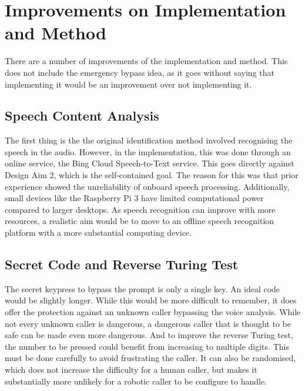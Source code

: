 \documentclass[main.tex]{subfiles}
\begin{document}
\section{Improvements on Implementation and Method}
There are a number of improvements of the implementation and method. This does not include the emergency bypass idea, as it goes without saying that implementing it would be an improvement over not implementing it.

\subsection{Speech Content Analysis}
The first thing is the the original identification method involved recognising the speech in the audio. However, in the implementation, this was done through an online service, the Bing Cloud Speech-to-Text service. This goes directly against Design Aim 2, which is the self-contained goal. The reason for this was that prior experience showed the unreliability of onboard speech processing. Additionally, small devices like the Raspberry Pi 3 have limited computational power compared to larger desktops. As speech recognition can improve with more resources, a realistic aim would be to move to an offline speech recognition platform with a more substantial computing device.

\subsection{Secret Code and Reverse Turing Test}
The secret keypress to bypass the prompt is only a single key. An ideal code would be slightly longer. While this would be more difficult to remember, it does offer the protection against an unknown caller bypassing the voice analysis. While not every unknown caller is dangerous, a dangerous caller that is thought to be safe can be made even more dangerous. And to improve the reverse Turing test, the number to be pressed could benefit from increasing to multiple digits. This must be done carefully to avoid frustrating the caller. It can also be randomised, which does not increase the difficulty for a human caller, but makes it substantially more unlikely for a robotic caller to be configure to handle.
\end{document}
